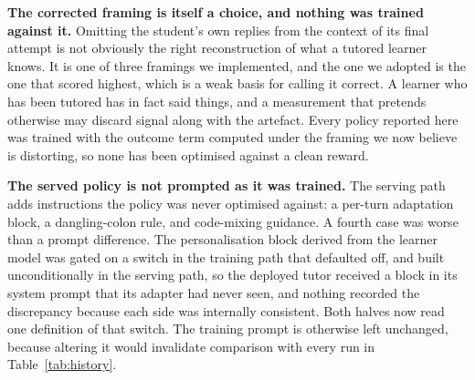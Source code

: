 \textbf{The corrected framing is itself a choice, and nothing was trained
against it.} Omitting the student's own replies from the context of its final
attempt is not obviously the right reconstruction of what a tutored learner
knows. It is one of three framings we implemented, and the one we adopted is the
one that scored highest, which is a weak basis for calling it correct. A learner
who has been tutored has in fact said things, and a measurement that pretends
otherwise may discard signal along with the artefact. Every policy reported here
was trained with the outcome term computed under the framing we now believe is
distorting, so none has been optimised against a clean reward.

\textbf{The served policy is not prompted as it was trained.} The serving path
adds instructions the policy was never optimised against: a per-turn adaptation
block, a dangling-colon rule, and code-mixing guidance. A fourth case was worse
than a prompt difference. The personalisation block derived from the learner
model was gated on a switch in the training path that defaulted off, and built
unconditionally in the serving path, so the deployed tutor received a block in
its system prompt that its adapter had never seen, and nothing recorded the
discrepancy because each side was internally consistent. Both halves now read
one definition of that switch. The training prompt is otherwise left unchanged,
because altering it would invalidate comparison with every run in
Table~\ref{tab:history}.


%
